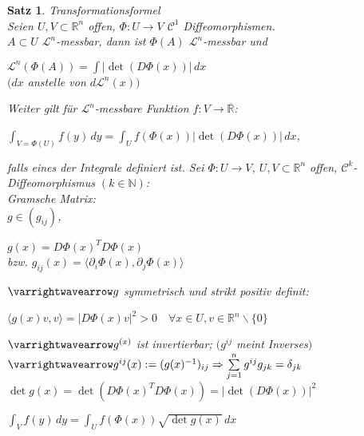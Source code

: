 \documentclass[11pt]{memoir}
\theoremstyle{changebreak}
\newtheorem{Satz}{Satz}[chapter]
\begin{document}
\begin{Satz}
\emph{Transformationsformel} \\
Seien $U, V \subset \mathbb R^n$ offen, $\Phi: U \rightarrow V$ $\mathscr C^1$ Diffeomorphismen. \\
$A \subset U $ $\mathscr L^n$-messbar, dann ist $\Phi(A) $ $\mathscr L^n$-messbar und \\
\begin{center}
	$\mathscr L^n(\Phi(A)) = \int |\det (D\Phi(x))| \, dx$\\
	$(dx$ anstelle von $d\mathscr L^n(x))$
\end{center}
Weiter gilt für $\mathscr L^n$-messbare Funktion $f: V \rightarrow \overline{\mathbb R}$:
\begin{center}
	$\int_{V = \Phi(U)} f(y) \, dy = \int_U f(\Phi(x))|\det (D\Phi(x))|\, dx$,
\end{center}
falls eines der Integrale definiert ist.
Sei $\Phi: U \rightarrow V$, $U, V \subset \mathbb R^n$ offen, $\mathscr C^k$-Diffeomorphismus $(k \in \mathbb N)$: \\


\emph{Gramsche Matrix}: \\
$g \in (g_{ij})$,
\begin{center}
	$g(x) = D\Phi(x)^T D \Phi(x)$ \\
	bzw. $g_{ij}(x) = \langle \partial_i \Phi(x), \partial_j \Phi(x) \rangle$
\end{center}
$\varrightwavearrow g$ symmetrisch und strikt positiv definit:
\begin{center}
	$\langle g(x)v, v\rangle = |D\Phi(x)v|^2 > 0\quad \forall x \in U, v \in \mathbb R^n\backslash \{0\}$
\end{center}
$\varrightwavearrow g^{(x)}$ ist invertierbar;
$(g^{ij}$ meint Inverses$)$ \\
$\varrightwavearrow g^{ij}(x) := (g(x)^{-1})_{ij} \Rightarrow \sum\limits_{j=1}^n g^{ij} g_{jk} = \delta_{jk}$ \\
$\det g(x) = \det(D\Phi(x)^T D \Phi(x)) = |\det(D \Phi(x))|^2$

\begin{center}
	$\int_V f(y) \, dy = \int_U f(\Phi(x)) \sqrt{\det g(x)} \, dx$
\end{center}

\end{Satz}
\end{document}
